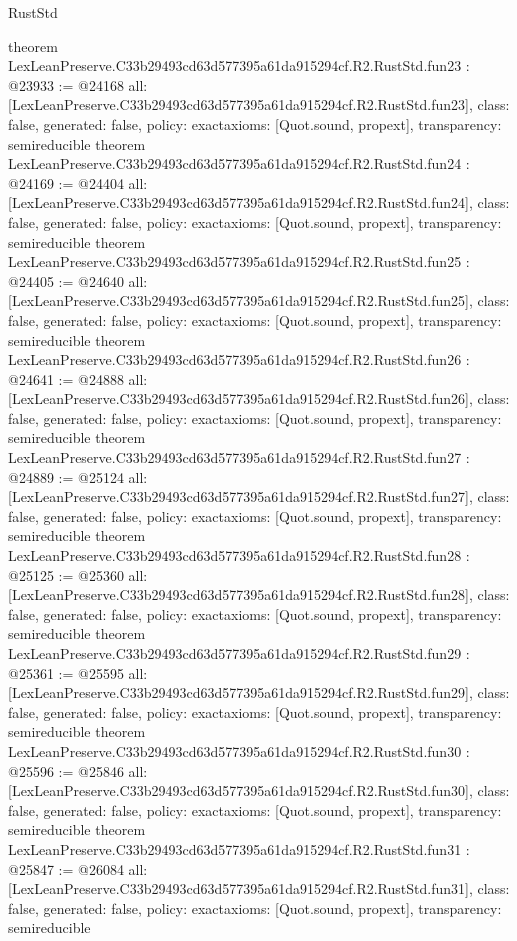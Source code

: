 \begin{lexlean}{RustStd}
\begin{coremodule}
{}
theorem LexLeanPreserve.C33b29493cd63d577395a61da915294cf.R2.RustStd.fun23 : @23933 := @24168 {
  all: [LexLeanPreserve.C33b29493cd63d577395a61da915294cf.R2.RustStd.fun23],
  class: false,
  generated: false,
  policy: exact{axioms: [Quot.sound, propext]},
  transparency: semireducible
}
theorem LexLeanPreserve.C33b29493cd63d577395a61da915294cf.R2.RustStd.fun24 : @24169 := @24404 {
  all: [LexLeanPreserve.C33b29493cd63d577395a61da915294cf.R2.RustStd.fun24],
  class: false,
  generated: false,
  policy: exact{axioms: [Quot.sound, propext]},
  transparency: semireducible
}
theorem LexLeanPreserve.C33b29493cd63d577395a61da915294cf.R2.RustStd.fun25 : @24405 := @24640 {
  all: [LexLeanPreserve.C33b29493cd63d577395a61da915294cf.R2.RustStd.fun25],
  class: false,
  generated: false,
  policy: exact{axioms: [Quot.sound, propext]},
  transparency: semireducible
}
theorem LexLeanPreserve.C33b29493cd63d577395a61da915294cf.R2.RustStd.fun26 : @24641 := @24888 {
  all: [LexLeanPreserve.C33b29493cd63d577395a61da915294cf.R2.RustStd.fun26],
  class: false,
  generated: false,
  policy: exact{axioms: [Quot.sound, propext]},
  transparency: semireducible
}
theorem LexLeanPreserve.C33b29493cd63d577395a61da915294cf.R2.RustStd.fun27 : @24889 := @25124 {
  all: [LexLeanPreserve.C33b29493cd63d577395a61da915294cf.R2.RustStd.fun27],
  class: false,
  generated: false,
  policy: exact{axioms: [Quot.sound, propext]},
  transparency: semireducible
}
theorem LexLeanPreserve.C33b29493cd63d577395a61da915294cf.R2.RustStd.fun28 : @25125 := @25360 {
  all: [LexLeanPreserve.C33b29493cd63d577395a61da915294cf.R2.RustStd.fun28],
  class: false,
  generated: false,
  policy: exact{axioms: [Quot.sound, propext]},
  transparency: semireducible
}
theorem LexLeanPreserve.C33b29493cd63d577395a61da915294cf.R2.RustStd.fun29 : @25361 := @25595 {
  all: [LexLeanPreserve.C33b29493cd63d577395a61da915294cf.R2.RustStd.fun29],
  class: false,
  generated: false,
  policy: exact{axioms: [Quot.sound, propext]},
  transparency: semireducible
}
theorem LexLeanPreserve.C33b29493cd63d577395a61da915294cf.R2.RustStd.fun30 : @25596 := @25846 {
  all: [LexLeanPreserve.C33b29493cd63d577395a61da915294cf.R2.RustStd.fun30],
  class: false,
  generated: false,
  policy: exact{axioms: [Quot.sound, propext]},
  transparency: semireducible
}
theorem LexLeanPreserve.C33b29493cd63d577395a61da915294cf.R2.RustStd.fun31 : @25847 := @26084 {
  all: [LexLeanPreserve.C33b29493cd63d577395a61da915294cf.R2.RustStd.fun31],
  class: false,
  generated: false,
  policy: exact{axioms: [Quot.sound, propext]},
  transparency: semireducible
}
\end{coremodule}
\end{lexlean}
